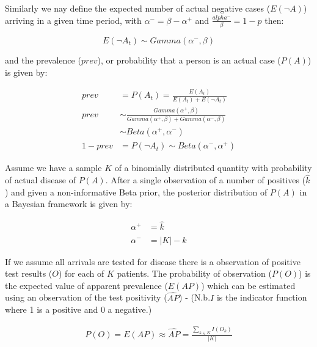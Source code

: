 \documentclass[a4paper, 12pt, twoside]{article}
\makeatletter
\newcommand*{\nb}{N.b.\@\xspace}
\makeatother
\begin{document}
Similarly we nay define the expected number of actual negative cases (\(E(\neg A)\)) arriving in a given time period, with \(\alpha^- = \beta-\alpha^+\) and \(\frac{alpha^-}{\beta} = 1-p\) then:

\begin{equation*}
E(\neg A_t) \sim Gamma(\alpha^-, \beta)
\end{equation*}

and the prevalence (\(prev\)), or probability that a person is an actual case (\(P(A)\)) is given by:

\begin{equation*}
\begin{aligned}
prev &= P(A_t) = \frac{E(A_t)}{E(A_t)+E(\neg A_t)} \\
prev &\sim \frac{Gamma(\alpha^+, \beta)}{  Gamma(\alpha^+, \beta) + Gamma(\alpha^-, \beta)} \\
&\sim Beta(\alpha^+,\alpha^-) \\
1 - prev &= P(\neg A_t) \sim {Beta}(\alpha^-, \alpha^+)
\end{aligned}
\end{equation*}

Assume we have a sample \(K\) of a binomially distributed quantity with probability of actual disease of \(P(A)\). After a single observation of a number of positives (\(\hat{k}\))
and given a non-informative Beta prior, the posterior distribution of \(P(A)\) in a Bayesian framework is given by:

\begin{equation*}
\begin{aligned}
\alpha^+ &= \hat{k} \\
\alpha^- &= |K|-\hat{k}
\end{aligned}
\end{equation*}

If we assume all arrivals are tested for disease there is a observation of positive test results (\(O\)) for each of \(K\) patients. The probability of observation (\(P(O)\)) is the expected value of apparent prevalence (\(E(AP)\)) which can be estimated using an observation of the test positivity (\(\widehat{AP}\)) - (\nb \(I\) is the indicator function where 1 is a positive and 0 a negative.)

\begin{equation*}
\begin{aligned}
P(O) = E(AP) \approx \widehat{AP} = \frac{\sum_{k \in K}{I(O_k)}}{|K|}
\end{aligned}
\end{equation*}
\end{document}
